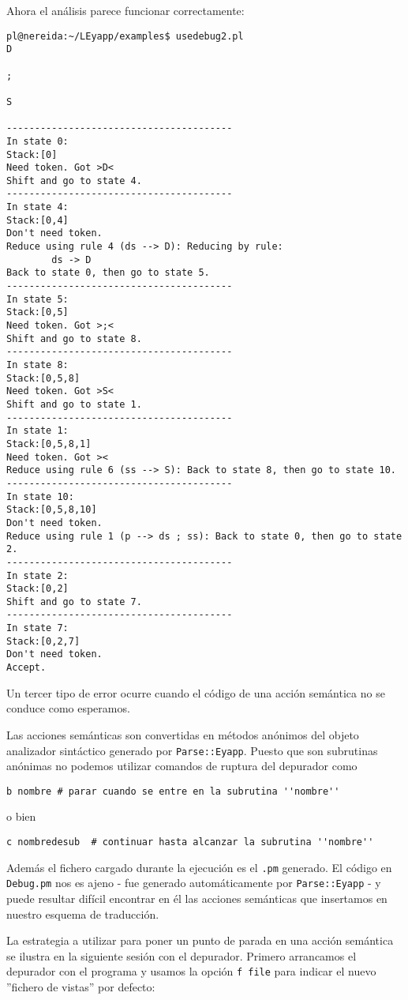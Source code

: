 Ahora el análisis 
parece funcionar correctamente:
\begin{verbatim}
pl@nereida:~/LEyapp/examples$ usedebug2.pl
D

;

S

----------------------------------------
In state 0:
Stack:[0]
Need token. Got >D<
Shift and go to state 4.
----------------------------------------
In state 4:
Stack:[0,4]
Don't need token.
Reduce using rule 4 (ds --> D): Reducing by rule:
        ds -> D
Back to state 0, then go to state 5.
----------------------------------------
In state 5:
Stack:[0,5]
Need token. Got >;<
Shift and go to state 8.
----------------------------------------
In state 8:
Stack:[0,5,8]
Need token. Got >S<
Shift and go to state 1.
----------------------------------------
In state 1:
Stack:[0,5,8,1]
Need token. Got ><
Reduce using rule 6 (ss --> S): Back to state 8, then go to state 10.
----------------------------------------
In state 10:
Stack:[0,5,8,10]
Don't need token.
Reduce using rule 1 (p --> ds ; ss): Back to state 0, then go to state 2.
----------------------------------------
In state 2:
Stack:[0,2]
Shift and go to state 7.
----------------------------------------
In state 7:
Stack:[0,2,7]
Don't need token.
Accept.
\end{verbatim}


Un tercer tipo de error ocurre cuando el código 
de una acción semántica no se conduce como esperamos.

Las acciones semánticas son convertidas en métodos
anónimos del objeto analizador sintáctico
generado por \verb|Parse::Eyapp|. Puesto que son 
subrutinas anónimas no podemos utilizar comandos
de ruptura del depurador como
\begin{verbatim}
b nombre # parar cuando se entre en la subrutina ''nombre''
\end{verbatim}
o bien
\begin{verbatim}
c nombredesub  # continuar hasta alcanzar la subrutina ''nombre''
\end{verbatim}
Además el fichero cargado durante la ejecución es el \verb|.pm|
generado. El código en \verb|Debug.pm| nos es ajeno
- fue generado automáticamente por \verb|Parse::Eyapp| -
y puede resultar difícil encontrar en él las acciones
semánticas que insertamos en nuestro esquema de traducción.

La estrategia a utilizar para poner un punto de parada
en una acción semántica se ilustra en la 
siguiente sesión con el depurador. Primero arrancamos
el depurador con el programa y usamos la opción \verb|f file|
para indicar el nuevo ''fichero de vistas'' por defecto:

